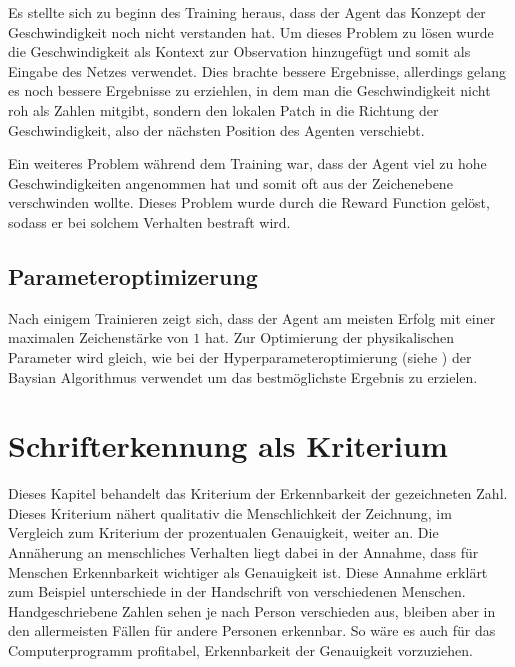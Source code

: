 Es stellte sich zu beginn des Training heraus, dass der Agent das Konzept der
Geschwindigkeit noch nicht verstanden hat. Um dieses Problem zu lösen wurde die %
Geschwindigkeit als Kontext zur Observation hinzugefügt und somit als Eingabe   %
des Netzes verwendet. Dies brachte bessere Ergebnisse, allerdings gelang es noch
bessere Ergebnisse zu erziehlen, in dem man die Geschwindigkeit nicht roh als
Zahlen mitgibt, sondern den lokalen Patch in die Richtung der Geschwindigkeit,
also der nächsten Position des Agenten verschiebt.

Ein weiteres Problem während dem Training war, dass der Agent viel zu hohe
Geschwindigkeiten angenommen hat und somit oft aus der Zeichenebene verschwinden
wollte. Dieses Problem wurde durch die Reward Function gelöst, sodass er bei
solchem Verhalten bestraft wird.


\subsection*{Parameteroptimizerung}
Nach einigem Trainieren zeigt sich, dass der Agent am meisten Erfolg mit einer
maximalen Zeichenstärke von $1$ hat. Zur Optimierung der physikalischen
Parameter wird gleich, wie bei der Hyperparameteroptimierung (siehe %
) der Baysian Algorithmus verwendet um
das bestmöglichste Ergebnis zu erzielen.





\section{Schrifterkennung als Kriterium}
Dieses Kapitel behandelt das Kriterium der Erkennbarkeit der gezeichneten Zahl.
Dieses Kriterium nähert qualitativ die Menschlichkeit der Zeichnung, im
Vergleich zum Kriterium der prozentualen Genauigkeit, weiter an. Die Annäherung
an menschliches Verhalten liegt dabei in der Annahme, dass für Menschen
Erkennbarkeit wichtiger als Genauigkeit ist. Diese Annahme erklärt zum Beispiel
unterschiede in der Handschrift von verschiedenen Menschen. Handgeschriebene
Zahlen sehen je nach Person verschieden aus, bleiben aber in den allermeisten
Fällen für andere Personen erkennbar. So wäre es auch für das Computerprogramm
profitabel, Erkennbarkeit der Genauigkeit vorzuziehen.

